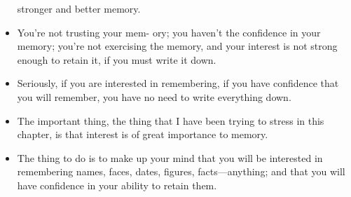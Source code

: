 \begin{itemize}
            stronger and better memory.
            \item You're not trusting your mem-
            ory; you haven't the confidence in your memory; you're not
            exercising the memory, and your interest is not strong
            enough to retain it, if you must write it down.
            \item Seriously, if you are interested in remembering, if you
            have confidence that you will remember, you have no need
            to write everything down.
            \item The important
            thing, the thing that I have been trying to stress in this
            chapter, is that interest is of great importance to memory.
            \item The thing to do is to make up your mind that you will
            be interested in remembering names, faces, dates, figures,
            facts—anything; and that you will have confidence in your
            ability to retain them.
        \end{itemize}

